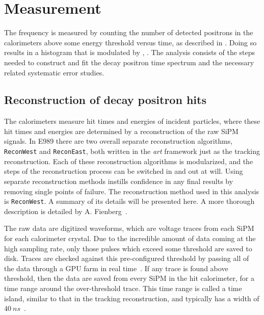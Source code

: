
\thispagestyle{myheadings}

\graphicspath{{Body/Figures/Wa/Reconstruction/}{Body/Figures/Wa/Histogramming/}{Body/Figures/Wa/Pileup/}{Body/Figures/Wa/Pileup/TimeAndEnergySpectra/}{Body/Figures/Wa/Pileup/Scaling/}{Body/Figures/Wa/RatioAnalysis/}{Body/Figures/Wa/RatioAnalysis/MethodOverview/}{Body/Figures/Wa/RatioAnalysis/VW_Studies/}{Body/Figures/Wa/Datasets/Endgame/LostMuonFiles/MainCuts/}{Body/Figures/Wa/Datasets/ComparisonPlots/LostMuons/}{Body/Figures/Wa/Datasets/60h/SingleIteration/SingleFits/}{Body/Figures/Wa/Datasets/9d/EnergyThreshold/}{Body/Figures/Wa/Datasets/60h/NoTimeRand/}}

\chapter{\texorpdfstring{\wa}{wa} Measurement}
\label{chapter:wa}


The \gmtwo frequency \wa is measured by counting the number of detected positrons in the calorimeters above some energy threshold versus time, as described in . Doing so results in a histogram that is modulated by \wa, . The \wa analysis consists of the steps needed to construct and fit the decay positron time spectrum and the necessary related systematic error studies.


\section{Reconstruction of decay positron hits}
\label{sec:ReconWest}


The calorimeters measure hit times and energies of incident particles, where these hit times and energies are determined by a reconstruction of the raw SiPM signals. In E989 there are two overall separate reconstruction algorithms, \texttt{ReconWest} and \texttt{ReconEast}, both written in the \textit{art} framework just as the tracking reconstruction. Each of these reconstruction algorithms is modularized, and the steps of the reconstruction process can be switched in and out at will. Using separate reconstruction methods instills confidence in any final results by removing single points of failure. The reconstruction method used in this analysis is \texttt{ReconWest}. A summary of its details will be presented here. A more thorough description is detailed by A. Fienberg~\cite{AFThesis}.


The raw data are digitized waveforms, which are voltage traces from each SiPM for each calorimeter crystal. Due to the incredible amount of data coming at the high sampling rate, only those pulses which exceed some threshold are saved to disk. Traces are checked against this pre-configured threshold by passing all of the data through a GPU farm in real time~\cite{Gohn:2016shi}. If any trace is found above threshold, then the data are saved from every SiPM in the hit calorimeter, for a time range around the over-threshold trace. This time range is called a time island, similar to that in the tracking reconstruction, and typically has a width of $\SI{40}{ns}$~\cite{AFThesis}.


